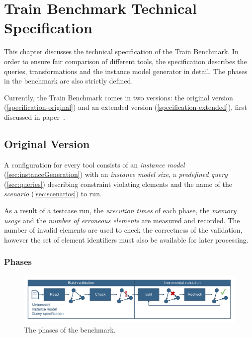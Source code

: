 \chapter{Train Benchmark Technical Specification}

This chapter discusses the technical specification of the Train Benchmark. In order to ensure fair comparison of different tools, the specification describes the queries, transformations and the instance model generator in detail. The phases in the benchmark are also strictly defined.

Currently, the Train Benchmark comes in two versions: the original version (\autoref{specification-original}) and an extended version (\autoref{specification-extended}), first discussed in paper~\cite{ASE2013}.
 
\section{Original Version}
\label{specification-original}

A  configuration for every tool consists of an \emph{instance model} (\autoref{sec:instanceGeneration}) with an \emph{instance model size}, a \emph{predefined query} (\autoref{sec:queries}) describing constraint violating elements and the name of the \emph{scenario} (\autoref{sec:scenarios}) to run.

As a result of a testcase run, the \emph{execution times} of each phase, the \emph{memory usage} and the \emph{number of erroneous elements} are measured and recorded. The number of invalid elements are used to check the correctness of the validation, however the set of element identifiers must also be available for later processing. 


\subsection{Phases}
\label{sec:phases}

\begin{figure}[htb]
	\centering
	\includegraphics[width=\textwidth]{figures/trainbenchmark-sequence}
	\caption{The phases of the benchmark.}
	\label{fig:phases}
\end{figure}


